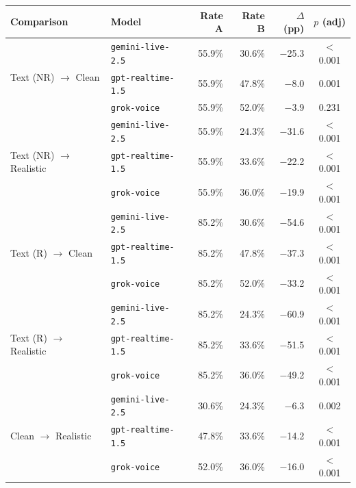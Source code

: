 \begin{tabular}{llrrrc}
\toprule
\textbf{Comparison} & {\textbf{Model}} & \textbf{Rate A} & \textbf{Rate B} & \textbf{$\Delta$ (pp)} & \textbf{$p$ (adj)} \\
\midrule
\multirow{3}{*}{Text (NR) $\to$ Clean} & {\texttt{gemini-live-2.5}} & 55.9\% & 30.6\% & $-$25.3 & $<$0.001 \\
 & {\texttt{gpt-realtime-1.5}} & 55.9\% & 47.8\% & $-$8.0 & 0.001 \\
 & {\texttt{grok-voice}} & 55.9\% & 52.0\% & $-$3.9 & 0.231 \\
\midrule
\multirow{3}{*}{Text (NR) $\to$ Realistic} & {\texttt{gemini-live-2.5}} & 55.9\% & 24.3\% & $-$31.6 & $<$0.001 \\
 & {\texttt{gpt-realtime-1.5}} & 55.9\% & 33.6\% & $-$22.2 & $<$0.001 \\
 & {\texttt{grok-voice}} & 55.9\% & 36.0\% & $-$19.9 & $<$0.001 \\
\midrule
\multirow{3}{*}{Text (R) $\to$ Clean} & {\texttt{gemini-live-2.5}} & 85.2\% & 30.6\% & $-$54.6 & $<$0.001 \\
 & {\texttt{gpt-realtime-1.5}} & 85.2\% & 47.8\% & $-$37.3 & $<$0.001 \\
 & {\texttt{grok-voice}} & 85.2\% & 52.0\% & $-$33.2 & $<$0.001 \\
\midrule
\multirow{3}{*}{Text (R) $\to$ Realistic} & {\texttt{gemini-live-2.5}} & 85.2\% & 24.3\% & $-$60.9 & $<$0.001 \\
 & {\texttt{gpt-realtime-1.5}} & 85.2\% & 33.6\% & $-$51.5 & $<$0.001 \\
 & {\texttt{grok-voice}} & 85.2\% & 36.0\% & $-$49.2 & $<$0.001 \\
\midrule
\multirow{3}{*}{Clean $\to$ Realistic} & {\texttt{gemini-live-2.5}} & 30.6\% & 24.3\% & $-$6.3 & 0.002 \\
 & {\texttt{gpt-realtime-1.5}} & 47.8\% & 33.6\% & $-$14.2 & $<$0.001 \\
 & {\texttt{grok-voice}} & 52.0\% & 36.0\% & $-$16.0 & $<$0.001 \\
\bottomrule
\end{tabular}
